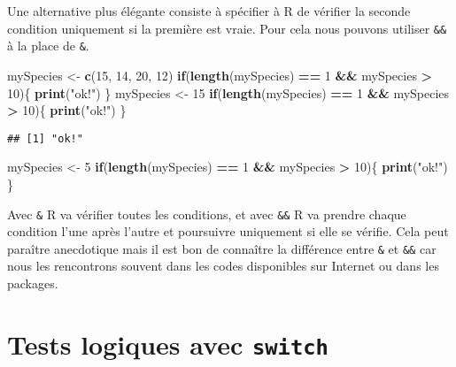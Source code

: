 \documentclass[]{book}
\newenvironment{Shaded}{\begin{snugshade}}{\end{snugshade}}
\newcommand{\KeywordTok}[1]{\textcolor[rgb]{0.13,0.29,0.53}{\textbf{#1}}}
\newcommand{\DecValTok}[1]{\textcolor[rgb]{0.00,0.00,0.81}{#1}}
\newcommand{\StringTok}[1]{\textcolor[rgb]{0.31,0.60,0.02}{#1}}
\newcommand{\ControlFlowTok}[1]{\textcolor[rgb]{0.13,0.29,0.53}{\textbf{#1}}}
\newcommand{\OperatorTok}[1]{\textcolor[rgb]{0.81,0.36,0.00}{\textbf{#1}}}
\newcommand{\NormalTok}[1]{#1}
\theoremstyle{definition}
\theoremstyle{definition}
\theoremstyle{definition}
\theoremstyle{remark}
\begin{document}
Une alternative plus élégante consiste à spécifier à R de vérifier la
seconde condition uniquement si la première est vraie. Pour cela nous
pouvons utiliser \texttt{\&\&} à la place de \texttt{\&}.

\begin{Shaded}
\begin{Highlighting}[]
\NormalTok{mySpecies <-}\StringTok{ }\KeywordTok{c}\NormalTok{(}\DecValTok{15}\NormalTok{, }\DecValTok{14}\NormalTok{, }\DecValTok{20}\NormalTok{, }\DecValTok{12}\NormalTok{)}
\ControlFlowTok{if}\NormalTok{(}\KeywordTok{length}\NormalTok{(mySpecies) }\OperatorTok{==}\StringTok{ }\DecValTok{1} \OperatorTok{&&}\StringTok{ }\NormalTok{mySpecies }\OperatorTok{>}\StringTok{ }\DecValTok{10}\NormalTok{)\{}
  \KeywordTok{print}\NormalTok{(}\StringTok{"ok!"}\NormalTok{)}
\NormalTok{\}}
\NormalTok{mySpecies <-}\StringTok{ }\DecValTok{15}
\ControlFlowTok{if}\NormalTok{(}\KeywordTok{length}\NormalTok{(mySpecies) }\OperatorTok{==}\StringTok{ }\DecValTok{1} \OperatorTok{&&}\StringTok{ }\NormalTok{mySpecies }\OperatorTok{>}\StringTok{ }\DecValTok{10}\NormalTok{)\{}
  \KeywordTok{print}\NormalTok{(}\StringTok{"ok!"}\NormalTok{)}
\NormalTok{\}}
\end{Highlighting}
\end{Shaded}

\begin{verbatim}
## [1] "ok!"
\end{verbatim}

\begin{Shaded}
\begin{Highlighting}[]
\NormalTok{mySpecies <-}\StringTok{ }\DecValTok{5}
\ControlFlowTok{if}\NormalTok{(}\KeywordTok{length}\NormalTok{(mySpecies) }\OperatorTok{==}\StringTok{ }\DecValTok{1} \OperatorTok{&&}\StringTok{ }\NormalTok{mySpecies }\OperatorTok{>}\StringTok{ }\DecValTok{10}\NormalTok{)\{}
  \KeywordTok{print}\NormalTok{(}\StringTok{"ok!"}\NormalTok{)}
\NormalTok{\}}
\end{Highlighting}
\end{Shaded}

Avec \texttt{\&} R va vérifier toutes les conditions, et avec
\texttt{\&\&} R va prendre chaque condition l'une après l'autre et
poursuivre uniquement si elle se vérifie. Cela peut paraître anecdotique
mais il est bon de connaître la différence entre \texttt{\&} et
\texttt{\&\&} car nous les rencontrons souvent dans les codes
disponibles sur Internet ou dans les packages.

\hypertarget{l17switch}{\section{\texorpdfstring{Tests logiques avec
\texttt{switch}}{Tests logiques avec switch}}\label{l17switch}}
\end{document}
